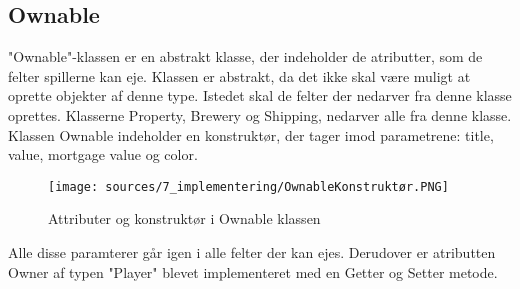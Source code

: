 \subsection{Ownable}
"Ownable"-klassen er en abstrakt klasse, der indeholder de atributter, som de felter spillerne kan eje. Klassen er abstrakt, da det ikke skal være muligt at oprette objekter af denne type. Istedet skal de felter der nedarver fra denne klasse oprettes. Klasserne Property, Brewery og Shipping, nedarver alle fra denne klasse. Klassen Ownable indeholder en konstruktør, der tager imod parametrene: title, value, mortgage value og color.
\begin{figure}
    \centering
    \texttt{[image: sources/7\_implementering/OwnableKonstruktør.PNG]}
    \caption{Attributer og konstruktør i Ownable klassen}
    \label{fig:OwnableKons}
\end{figure}
Alle disse paramterer går igen i alle felter der kan ejes. Derudover er atributten Owner af typen "Player" blevet implementeret med en Getter og Setter metode.